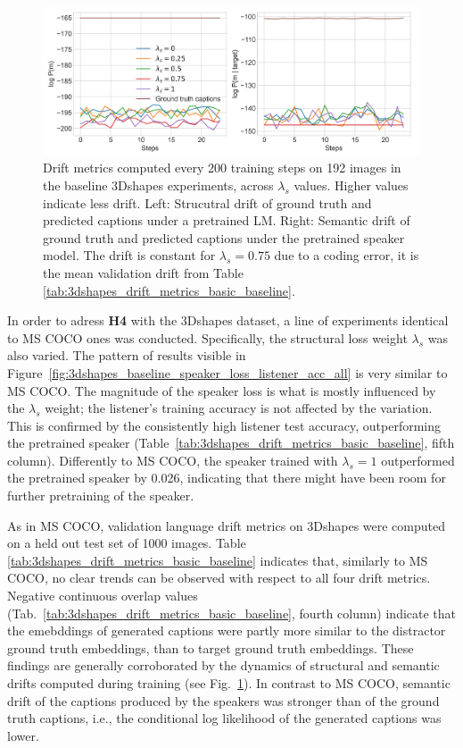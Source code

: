 \begin{figure}[h]
	\centering
	\includegraphics[width=\linewidth]{images/shapes_structural_semantic_drift_49_pure_L_s_all_random.png}
	\caption{Drift metrics computed every 200 training steps on 192 images in the baseline 3Dshapes experiments, across $\lambda_s$ values. Higher values indicate less drift. Left: Strucutral drift of ground truth and predicted captions under a pretrained LM. Right: Semantic drift of ground truth and predicted captions under the pretrained speaker model. The drift is constant for $\lambda_s = 0.75$ due to a coding error, it is the mean validation drift from Table \ref{tab:3dshapes_drift_metrics_basic_baseline}.} 
	\label{fig:3dshapes_baseline_all_str_sem_drift}
\end{figure}

In order to adress \textbf{H4} with the 3Dshapes dataset, a line of experiments identical to MS COCO ones was conducted. Specifically, the structural loss weight $\lambda_s$ was also varied. The pattern of results visible in Figure~\ref{fig:3dshapes_baseline_speaker_loss_listener_acc_all} is very similar to MS COCO. The magnitude of the speaker loss is what is mostly influenced by the $\lambda_s$ weight; the listener's training accuracy is not affected by the variation. This is confirmed by the consistently high listener test accuracy, outperforming the pretrained speaker (Table~\ref{tab:3dshapes_drift_metrics_basic_baseline}, fifth column). Differently to MS COCO, the speaker trained with $\lambda_s = 1$ outperformed the pretrained speaker by 0.026, indicating that there might have been room for further pretraining of the speaker. 

As in MS COCO, validation language drift metrics on 3Dshapes were computed on a held out test set of 1000 images. Table \ref{tab:3dshapes_drift_metrics_basic_baseline} indicates that, similarly to MS COCO, no clear trends can be observed with respect to all four drift metrics. Negative continuous overlap values (Tab.~\ref{tab:3dshapes_drift_metrics_basic_baseline}, fourth column) indicate that the emebddings of generated captions were partly more similar to the distractor ground truth embeddings, than to target ground truth embeddings. These findings are generally corroborated by the dynamics of structural and semantic drifts computed during training (see Fig.~\ref{fig:3dshapes_baseline_all_str_sem_drift}). In contrast to MS COCO, semantic drift of the captions produced by the speakers was stronger than of the ground truth captions, i.e., the conditional log likelihood of the generated captions was lower. 

